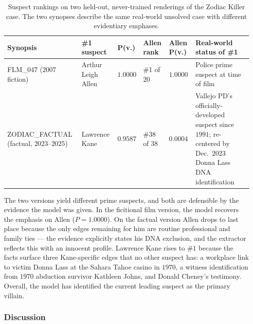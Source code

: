 \documentclass[11pt]{article}
\theoremstyle{definition}
\begin{document}
\begin{table}[h]
\centering
\footnotesize
\caption{Suspect rankings on two held-out, never-trained renderings of the Zodiac Killer case. The two synopses describe the same real-world unsolved case with different evidentiary emphases.}
\label{tab:zodiac}
\begin{tabular}{>{\raggedright\arraybackslash}p{3.0cm}>{\raggedright\arraybackslash}p{2.4cm}>{\raggedright\arraybackslash}p{1.0cm}>{\raggedright\arraybackslash}p{1.5cm}>{\raggedright\arraybackslash}p{1.2cm}>{\raggedright\arraybackslash}p{4.2cm}}
\toprule
\textbf{Synopsis} & \textbf{\#1 suspect} & \textbf{P(v.)} & \textbf{Allen rank} & \textbf{Allen P(v.)} & \textbf{Real-world status of \#1} \\
\midrule
FLM\_047 ($2007$ fiction) & Arthur Leigh Allen & $1.0000$ & \#1 of $20$ & $1.0000$ & Police prime suspect at time of film \\
ZODIAC\_FACTUAL (factual, $2023$--$2025$) & Lawrence Kane & $0.9587$ & \#$38$ of $38$ & $0.0004$ & Vallejo PD's officially-developed suspect since $1991$; re-centered by Dec.~$2023$ Donna Lass DNA identification \\
\bottomrule
\end{tabular}
\end{table}

The two versions yield different prime suspects, and both are defensible by the evidence the model was given. In the ficitional film version, the model recovers the emphasis on Allen ($P=1.0000$). On the factual version Allen drops to last place because the only edges remaining for him are routine professional and family ties --- the evidence explicitly states his DNA exclusion, and the extractor reflects this with an innocent profile. Lawrence Kane rises to \#$1$ because the facts surface three Kane-specific edges that no other suspect has: a workplace link to victim Donna Lass at the Sahara Tahoe casino in $1970$, a witness identification from $1970$ abduction survivor Kathleen Johns, and Donald Cheney's testimony. Overall, the model has identified the current leading suspect as the primary villain.

\subsubsection{Discussion}
\label{sec:discussion}
\end{document}
